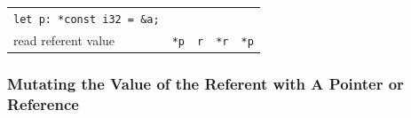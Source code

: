 \documentclass[
]{book}
\begin{document}
\begin{longtable}[]{@{}lllll@{}}
\begin{minipage}[t]{0.22\columnwidth}
\texttt{let\ p:\ *const\ i32\ =\ \&a;}\strut
\end{minipage}\tabularnewline
\begin{minipage}[t]{0.16\columnwidth}\raggedright
read referent value\strut
\end{minipage} & \begin{minipage}[t]{0.16\columnwidth}\raggedright
\texttt{*p}\strut
\end{minipage} & \begin{minipage}[t]{0.16\columnwidth}\raggedright
\texttt{r}\strut
\end{minipage} & \begin{minipage}[t]{0.16\columnwidth}\raggedright
\texttt{*r}\strut
\end{minipage} & \begin{minipage}[t]{0.22\columnwidth}\raggedright
\texttt{*p}\strut
\end{minipage}\tabularnewline
\bottomrule
\end{longtable}

\hypertarget{mutating-the-value-of-the-referent-with-a-pointer-or-reference}{%
\subsubsection{Mutating the Value of the Referent with A Pointer or Reference}\label{mutating-the-value-of-the-referent-with-a-pointer-or-reference}}
\end{document}
